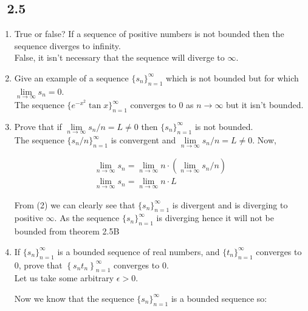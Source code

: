 \documentclass[11pt, letterpaper]{article}
\begin{document}
\subsection{\exr \, 2.5}
\begin{enumerate}
\item{True or false? If a sequence of positive numbers is not bounded then the sequence diverges to infinity.\\
	False, it isn't necessary that the sequence will diverge to $\infty$.
}

\item{Give an example of a sequence $\lbrace s_n \rbrace_{n=1}^\infty$ which is not bounded but for which $\lim \limits_{n \to \infty} s_n = 0$.\\
	The sequence $ \lbrace e^{-x^2}\tan{x} \rbrace_{n=1}^\infty $ converges to 0 as $n \to \infty$ but it isn't bounded.
}

\item{Prove that if $\lim \limits_{n \to \infty} s_n / n = L \neq 0$ then $\lbrace s_n \rbrace_{n=1}^\infty$ is not bounded.\\
	The sequence $ \lbrace s_n/n \rbrace_{n=1}^\infty $ is convergent and $\lim \limits_{n \to \infty} s_n/n = L \neq 0$. Now, 
	
	\setcounter{equation}{0}
	
	\begin{eqnarray}
		\lim \limits_{n \to \infty} s_n = \lim \limits_{n \to \infty} n \cdot\left( \lim \limits_{n \to \infty} s_n/n \right)\\
		\lim \limits_{n \to \infty} s_n = \lim \limits_{n \to \infty} n \cdot L
	\end{eqnarray}
	
	From (2) we can clearly see that $ \lbrace s_n \rbrace_{n=1}^\infty $ is divergent and is diverging to positive $\infty$. As the sequence $ \lbrace s_n \rbrace_{n=1}^\infty $ is diverging hence it will not be bounded from theorem 2.5B
}

\item{If $\lbrace s_n \rbrace_{n=1}^\infty$ is a bounded sequence of real numbers, and $\lbrace t_n \rbrace_{n=1}^\infty$ converges to 0, prove that $\left\lbrace s_n t_n\right\rbrace_{n=1}^\infty$ converges to 0.\\
	Let us take some arbitrary $\epsilon > 0$.
	
	Now we know that the sequence $ \lbrace s_n \rbrace_{n=1}^\infty $ is a bounded sequence so:
	
}
\end{enumerate}
\end{document}
